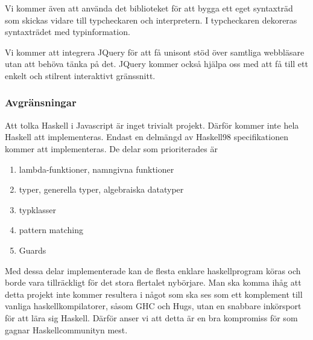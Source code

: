Vi kommer även att använda det biblioteket för att bygga ett eget syntaxträd som skickas vidare till typcheckaren och interpretern. I typcheckaren dekoreras syntaxträdet med typinformation.

Vi kommer att integrera JQuery \citep{jquery} för att få unisont stöd över samtliga webbläsare utan att behöva tänka på det. JQuery kommer också hjälpa oss med att få till ett enkelt och stilrent interaktivt gränssnitt.

\subsubsection{Avgränsningar}
Att tolka Haskell i Javascript är inget trivialt projekt. Därför kommer inte hela Haskell att implementeras. 
Endast en delmängd av Haskell98 specifikationen kommer att implementeras. De delar som prioriterades är
        \begin{enumerate}
            \item{lambda-funktioner, namngivna funktioner}
            \item{typer, generella typer, algebraiska datatyper}
            \item{typklasser}
            \item{pattern matching}
            \item{Guards}
            \end{enumerate}
Med dessa delar implementerade kan de flesta enklare haskellprogram köras och borde vara tillräckligt för det stora flertalet nybörjare. Man ska komma ihåg att detta projekt inte kommer resultera i något som ska ses som ett komplement till vanliga haskellkompilatorer, såsom GHC och Hugs, utan en snabbare inkörsport för att lära sig Haskell. Därför anser vi att detta är en bra kompromiss för som gagnar Haskellcommunityn mest. %


